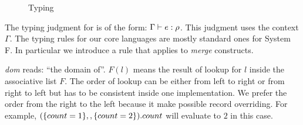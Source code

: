 \begin{figure*}



\caption{Typing}
\end{figure*}

The typing judgment for \name is of the form: $ \Gamma \vdash e : \rho $. This
judgment uses the context $ \Gamma $. The typing rules for our core languages
are mostly standard ones for System F. In particular we introduce a
 rule that applies to \emph{merge} constructs.


\textit{dom} reads: ``the domain of''. $ F(l) $ means the result of lookup for
$ l $ inside the associative list $ F $. The order of lookup can be either from
left to right or from right to left but has to be consistent inside one
implementation. We prefer the order from the right to the left because it make
possible record overriding. For example,
$ (\{ count = 1 \} ,, \{ count = 2 \}).count $ will evaluate to
$ 2 $ in this case.